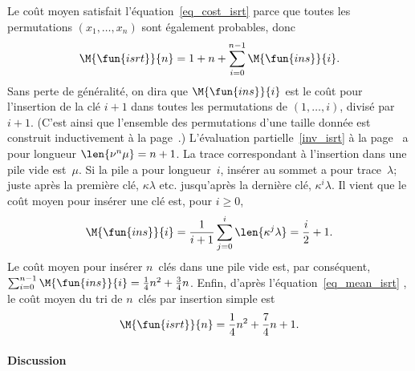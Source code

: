 Le coût moyen satisfait l'équation~\eqref{eq_cost_isrt} parce que
toutes les permutations \((x_1,\dots,x_n)\) sont également probables, donc
\begin{equation}
\M{\fun{isrt}}{n} = 1 + n + \sum_{i=0}^{n-1}\M{\fun{ins}}{i}.
\label{eq_mean_isrt}
\end{equation}
Sans perte de généralité, on dira que
\(\M{\fun{ins}}{i}\) est le coût pour
l'insertion de la clé \(i+1\) dans toutes les permutations de
\((1,\dots,i)\), divisé par \(i+1\). (C'est ainsi que l'ensemble des
permutations d'une taille donnée est construit
inductivement à la page~\pageref{par:permutations}.) L'évaluation
partielle~\eqref{inv_isrt} à la page~\pageref{inv_isrt} a pour longueur
\(\len{\nu^n\mu}=n+1\). La trace correspondant à l'insertion dans une
pile vide est~\(\mu\). Si la pile a pour longueur~\(i\), insérer au
sommet a pour trace~\(\lambda\); juste après la première clé,
\(\kappa\lambda\) etc. jusqu'après la dernière clé,
\(\kappa^i\lambda\). Il vient que le coût moyen pour insérer une clé
est, pour \(i \geqslant 0\),
\begin{equation}
\M{\fun{ins}}{i} = \frac{1}{i+1}\sum_{j=0}^{i}\len{\kappa^j\lambda}
                 = \frac{i}{2}+1.
\label{eq_ins}
\end{equation}
Le coût moyen pour insérer \(n\)~clés dans une pile vide est, par
conséquent, \(\sum_{i=0}^{n-1}\M{\fun{ins}}{i} = \frac{1}{4}n^2 +
\frac{3}{4}n\). Enfin, d'après l'équation~\eqref{eq_mean_isrt}
, le coût moyen du tri de \(n\)~clés par
insertion simple est
\begin{equation*}
\M{\fun{isrt}}{n} = \frac{1}{4}n^2 + \frac{7}{4}n + 1.
\end{equation*}

\paragraph{Discussion}

